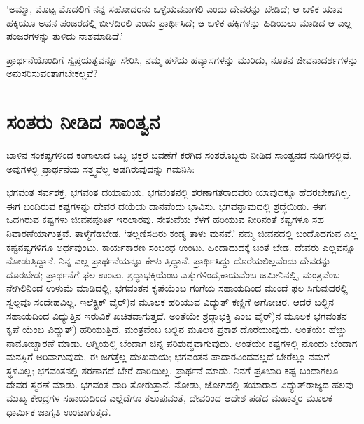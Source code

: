 ‘ಅಮ್ಮಾ, ಮೊಟ್ಟ ಮೊದಲಿಗೆ ನನ್ನ ಸಹೋದರನು ಒಳ್ಳೆಯವನಾಗಲಿ ಎಂದು ದೇವರನ್ನು ಬೇಡಿದೆ; ಆ ಬಳಿಕ ಯಾವ ಹಕ್ಕಿಯೂ ಅವನ ಪಂಜರದಲ್ಲಿ ಬೀಳದಿರಲಿ ಎಂದು ಪ್ರಾರ್ಥಿಸಿದೆ; ಆ ಬಳಿಕ ಹಕ್ಕಿಗಳನ್ನು ಹಿಡಿಯಲು ಮಾಡಿದ ಆ ಎಲ್ಲ ಪಂಜರಗಳನ್ನು ತುಳಿದು ನಾಶಮಾಡಿದೆ.’

ಪ್ರಾರ್ಥನೆಯೊಂದಿಗೆ ಸ್ವಪ್ರಯತ್ನವನ್ನೂ ಸೇರಿಸಿ, ನಮ್ಮ ಹಳೆಯ ಹವ್ಯಾಸಗಳನ್ನು ಮುರಿದು, ನೂತನ ಜೀವನಾದರ್ಶಗಳನ್ನು ಅನುಸರಿಸುವಂತಾಗಬೇಕಲ್ಲವೆ?


\section{ಸಂತರು ನೀಡಿದ ಸಾಂತ್ವನ}

ಬಾಳಿನ ಸಂಕಷ್ಟಗಳಿಂದ ಕಂಗಾಲಾದ ಒಬ್ಬ ಭಕ್ತರ ಬವಣೆಗೆ ಕರಗಿದ ಸಂತರೊಬ್ಬರು ನೀಡಿದ ಸಾಂತ್ವನದ ನುಡಿಗಳಿಲ್ಲಿವೆ. ಅವುಗಳಲ್ಲಿ ಪ್ರಾರ್ಥನೆಯ ಸತ್ತ್ವವೆಲ್ಲ ಅಡಗಿರುವುದನ್ನು ಗಮನಿಸಿ:

ಭಗವಂತ ಸರ್ವಶಕ್ತ, ಭಗವಂತ ದಯಾಮಯ. ಭಗವಂತನಲ್ಲಿ ಶರಣಾಗತರಾದವರು ಯಾವುದಕ್ಕೂ ಹೆದರಬೇಕಾಗಿಲ್ಲ. ಈಗ ಬಂದಿರುವ ಕಷ್ಟಗಳನ್ನು ದೇವರ ದಯೆಯ ದಾನವೆಂದು ಭಾವಿಸು. ಭಗವನ್ನಾಮದಲ್ಲಿ ಶ್ರದ್ಧೆಯಿಡು. ಈಗ ಒದಗಿರುವ ಕಷ್ಟಗಳು ಜೀವನಪೂರ್ತಿ ಇರಲಾರವು. ಸೇತುವೆಯ ಕೆಳಗೆ ಹರಿಯುವ ನೀರಿನಂತೆ ಕಷ್ಟಗಳೂ ಸಹ ನಿವಾರಣೆಯಾಗುತ್ತವೆ. ತಾಳ್ಮೆಗೆಡಬೇಡ. ‘ತಲ್ಲಣಿಸದಿರು ಕಂಡ್ಯ ತಾಳು ಮನವೆ.’ ನಮ್ಮ ಜೀವನದಲ್ಲಿ ಬಂದೊದಗುವ ಎಲ್ಲ ಕಷ್ಟನಷ್ಟಗಳಿಗೂ ಅರ್ಥವುಂಟು. ಕಾರ್ಯಕಾರಣ ಸಂಬಂಧ ಉಂಟು. ಹಿಂದಾದುದಕ್ಕೆ ಚಿಂತೆ ಬೇಡ. ದೇವರು ಎಲ್ಲವನ್ನೂ ನೋಡುತ್ತಿದ್ದಾನೆ. ನಿನ್ನ ಎಲ್ಲ ಪ್ರಾರ್ಥನೆಯನ್ನೂ ಕೇಳು ತ್ತಿದ್ದಾನೆ. ಪ್ರಾರ್ಥಿಸಿದ್ದು ದೊರೆಯಲಿಲ್ಲವೆಂದು ದೇವರನ್ನು ದೂರಬೇಡ; ಪ್ರಾರ್ಥನೆಗೆ ಫಲ ಉಂಟು. ಶ್ರದ್ಧಾಭಕ್ತಿಯೆಂಬ ಎತ್ತುಗಳಿಂದ,ಕಾಯವೆಂಬ ಜಮೀನಿನಲ್ಲಿ, ಮಂತ್ರವೆಂಬ ನೇಗಿಲಿನಿಂದ ಉಳುಮೆ ಮಾಡಿದಲ್ಲಿ, ಭಗವಂತನ ಕೃಪೆಯೆಂಬ ಗಂಗೆಯ ಸಹಾಯದಿಂದ ಮುಂದೆ ಫಲ ಸಿಗುವುದರಲ್ಲಿ ಸ್ವಲ್ಪವೂ ಸಂದೇಹವಿಲ್ಲ. ಇಲೆಕ್ಟ್ರಿಕ್ ವೈರ್​)ನ ಮೂಲಕ ಹರಿಯುವ ವಿದ್ಯುತ್ ಕಣ್ಣಿಗೆ ಅಗೋಚರ. ಆದರೆ ಬಲ್ಬಿನ ಸಹಾಯದಿಂದ ವಿದ್ಯುತ್ತಿನ ಇರುವಿಕೆ ಖಚಿತವಾಗುತ್ತದೆ. ಅಂತೆಯೇ ಶ್ರದ್ಧಾಭಕ್ತಿ ಎಂಬ ವೈರ್​)ನ ಮೂಲಕ ಭಗವಂತನ ಕೃಪೆ ಯೆಂಬ ವಿದ್ಯುತ್​) ಹರಿಯುತ್ತಿದೆ. ಮಂತ್ರವೆಂಬ ಬಲ್ಬಿನ ಮೂಲಕ ಪ್ರಕಾಶ ದೊರೆಯುವುದು. ಅಂತೆಯೇ ಹೆಚ್ಚು ನಾಮೋಚ್ಚಾರಣೆ ಮಾಡು. ಅಗ್ನಿಯಲ್ಲಿ ಬೆಂದಾಗ ಚಿನ್ನ ಪರಿಶುದ್ಧವಾಗುವುದು. ಅಂತೆಯೇ ಕಷ್ಟಗಳಲ್ಲಿ ನೊಂದು ಬೆಂದಾಗ ಮನಸ್ಸಿಗೆ ಅರಿವಾಗುವುದು, ಈ ಜಗತ್ತೆಲ್ಲ ದುಃಖಮಯ; ಭಗವಂತನ ಪಾದಾರವಿಂದವಲ್ಲದೆ ಬೇರೆಲ್ಲೂ ನಮಗೆ ಸ್ಥಳವಿಲ್ಲ; ಭಗವಂತನಲ್ಲಿ ಶರಣಾಗದೆ ಬೇರೆ ದಾರಿಯಿಲ್ಲ. ಪ್ರಾರ್ಥನೆ ಮಾಡು. ನಿನಗೆ ಪ್ರತಿಬಾರಿ ಕಷ್ಟ ಬಂದಾಗಲೂ ದೇವರ ಸ್ಮರಣೆ ಮಾಡು. ಭಗವಂತ ದಾರಿ ತೋರುತ್ತಾನೆ. ನೋಡು, ಜೋಗದಲ್ಲಿ ತಯಾರಾದ ವಿದ್ಯುತ್​ರಾಜ್ಯದ ಹಲವು ಮುಖ್ಯ ಕೇಂದ್ರಗಳ ಸಹಾಯದಿಂದ ಎಲ್ಲೆಡೆಗೂ ತಲುಪುವಂತೆ, ದೇವರಿಂದ ಆದೇಶ ಪಡೆದ ಮಹಾತ್ಮರ ಮೂಲಕ ಧಾರ್ಮಿಕ ಜಾಗೃತಿ ಉಂಟಾಗುತ್ತದೆ.

